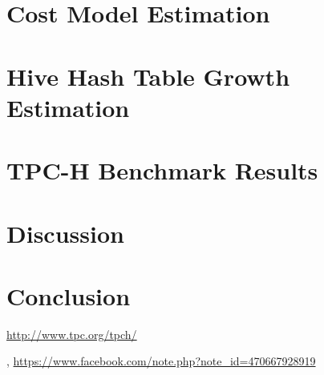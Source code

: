 \documentclass[11pt]{article}
\begin{document}
\section{Cost Model Estimation}

\section{Hive Hash Table Growth Estimation}

\section{TPC-H Benchmark Results}

\section{Discussion}
\section{Conclusion}


\begin{thebibliography}{77}
\url{http://www.tpc.org/tpch/}

\author{Liyin Tang},
\url{https://www.facebook.com/note.php?note_id=470667928919}

\end{thebibliography}


\end{document}
